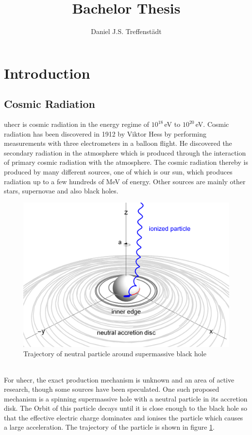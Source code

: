 \documentclass[abstract,toc,los,english,11pt,glossaries]{jluthesis}
\title[Bachelor Thesis]{Bachelor Thesis}
\author[Daniel Treffenstädt]{Daniel J.S. Treffenstädt}
\begin{document}

\section{Introduction}
\subsection{Cosmic Radiation}
\acrfull{uhecr} is cosmic radiation in the energy regime of $10^{18}$\,eV to $10^{20}$\,eV. Cosmic radiation has been discovered in 1912 by Viktor Hess by performing measurements with three electrometers in a balloon flight. He discovered the secondary radiation in the atmosphere which is produced through the interaction of primary cosmic radiation with the atmosphere. The cosmic radiation thereby is produced by many different sources, one of which is our sun, which produces radiation up to a few hundreds of MeV of energy. Other sources are mainly other stars, supernovae and also black holes. \\
\begin{figure}[ht!]
	\centering
	\includegraphics[width=0.5\linewidth]{data/uhecr-sm-bh}
	\caption{Trajectory of neutral particle around supermassive black hole \cite{Tursunov_2020}}
	\label{fig:uhecr-sm-bh}
\end{figure}\\
For \acrshort{uhecr}, the exact production mechanism is unknown and an area of active research, though some sources have been speculated. One such proposed mechanism is a spinning supermassive hole with a neutral particle in its accretion disk. The Orbit of this particle decays until it is close enough to the black hole so that the effective electric charge dominates and ionises the particle which causes a large acceleration\cite{Tursunov_2020}. The trajectory of the particle is shown in figure \ref{fig:uhecr-sm-bh}.\\
\end{document}
